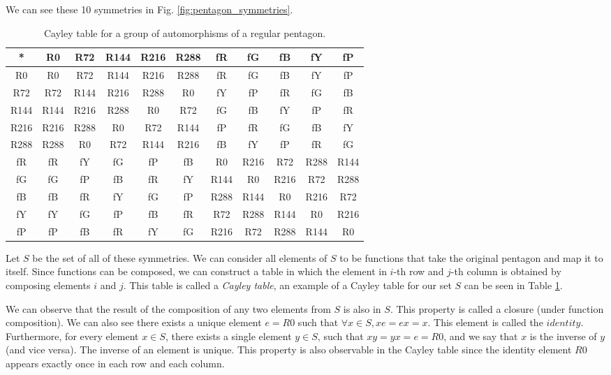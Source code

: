 We can see these 10 symmetries in Fig. \ref{fig:pentagon_symmetries}.

\begin{table}
\small
\begin{tabular}{ c | c c c c c c c c c c }
\hline
* & R0 & R72 & R144 & R216 & R288 & fR & fG & fB & fY & fP \\
\hline
R0 & R0 & R72 & R144 & R216 & R288 & fR & fG & fB & fY & fP \\
R72 & R72 & R144 & R216 & R288 & R0 & fY & fP & fR & fG & fB \\
R144 & R144 & R216 & R288 & R0 & R72 & fG & fB & fY & fP & fR \\
R216 & R216 & R288 & R0 & R72 & R144 & fP & fR & fG & fB & fY \\
R288 & R288 & R0 & R72 & R144 & R216 & fB & fY & fP & fR & fG \\
fR & fR & fY & fG & fP & fB & R0 & R216 & R72 & R288 & R144 \\
fG & fG & fP & fB & fR & fY & R144 & R0 & R216 & R72 & R288 \\
fB & fB & fR & fY & fG & fP & R288 & R144 & R0 & R216 & R72 \\
fY & fY & fG & fP & fB & fR & R72 & R288 & R144 & R0 & R216 \\
fP & fP & fB & fR & fY & fG &R216 & R72 & R288 & R144 & R0 \\
\hline
\end{tabular}
\caption{\label{table:cayley_table} Cayley table for a group of automorphisms of a regular pentagon.}
\end{table}

Let $S$ be the set of all of these symmetries. We can consider all elements of $S$ to be functions that take the original pentagon and map it to itself. Since functions can be composed, we can construct a table in which the element in $i$-th row and $j$-th column is obtained by composing elements $i$ and $j$. This table is called a \emph{Cayley table}, an example of a Cayley table for our set $S$ can be seen in Table \ref{table:cayley_table}.

We can observe that the result of the composition of any two elements from $S$ is also in $S$. This property is called a closure (under function composition). We can also see there exists a unique element $e=R0$ such that $\forall x \in S, xe = ex = x$. This element is called the $identity$. Furthermore, for every element $x \in S$, there exists a single element $y \in S$, such that $xy = yx = e = R0$, and we say that $x$ is the inverse of $y$ (and vice versa). The inverse of an element is unique. This property is also observable in the Cayley table since the identity element $R0$ appears exactly once in each row and each column.

